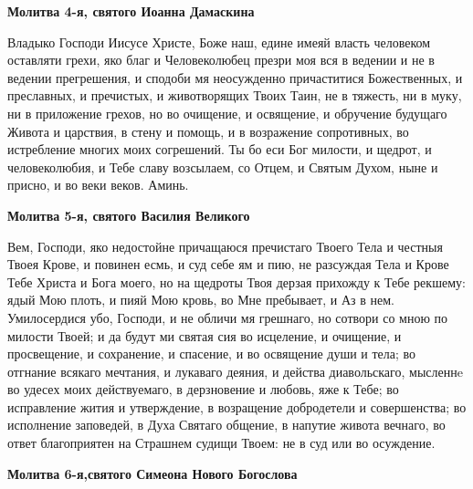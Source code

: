 \medskip
\bfseries Молитва 4-я, святого Иоанна Дамаскина\normalfont{}


Владыко Господи Иисусе Христе, Боже наш, едине имеяй власть человеком оставляти грехи, яко благ и Человеколюбец презри моя вся в ведении и не в ведении прегрешения, и сподоби мя неосужденно причаститися Божественных, и преславных, и пречистых, и животворящих Твоих Таин, не в тяжесть, ни в муку, ни в приложение грехов, но во очищение, и освящение, и обручение будущаго Живота и царствия, в стену и помощь, и в возражение сопротивных, во истребление многих моих согрешений. Ты бо еси Бог милости, и щедрот, и человеколюбия, и Тебе славу возсылаем, со Отцем, и Святым Духом, ныне и присно, и во веки веков. Аминь.


\medskip
\bfseries Молитва 5-я, святого Василия Великого\normalfont{}


Вем, Господи, яко недостойне причащаюся пречистаго Твоего Тела и честныя Твоея Крове, и повинен есмь, и суд себе ям и пию, не разсуждая Тела и Крове Тебе Христа и Бога моего, но на щедроты Твоя дерзая прихожду к Тебе рекшему: ядый Мою плоть, и пияй Мою кровь, во Мне пребывает, и Аз в нем. Умилосердися убо, Господи, и не обличи мя грешнаго, но сотвори со мною по милости Твоей; и да будут ми святая сия во исцеление, и очищение, и просвещение, и сохранение, и спасение, и во освящение души и тела; во отгнание всякаго мечтания, и лукаваго деяния, и действа диавольскаго, мысленнe во удесех моих действуемаго, в дерзновение и любовь, яже к Тебе; во исправление жития и утверждение, в возращение добродетели и совершенства; во исполнение заповедей, в Духа Святаго общение, в напутие живота вечнаго, во ответ благоприятен на Страшнем судищи Твоем: не в суд или во осуждение.


\medskip
\bfseries Молитва 6-я,святого Симеона Нового Богослова\normalfont{}


